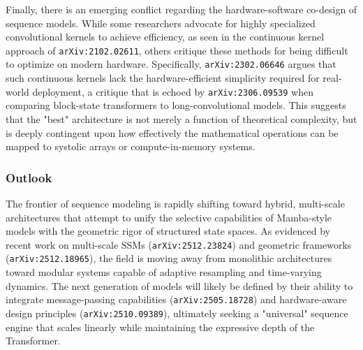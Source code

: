 \documentclass[11pt]{article}
\begin{document}
Finally, there is an emerging conflict regarding the hardware-software co-design of sequence models. While some researchers advocate for highly specialized convolutional kernels to achieve efficiency, as seen in the continuous kernel approach of \texttt{arXiv:2102.02611}, others critique these methods for being difficult to optimize on modern hardware. Specifically, \texttt{arXiv:2302.06646} argues that such continuous kernels lack the hardware-efficient simplicity required for real-world deployment, a critique that is echoed by \texttt{arXiv:2306.09539} when comparing block-state transformers to long-convolutional models. This suggests that the "best" architecture is not merely a function of theoretical complexity, but is deeply contingent upon how effectively the mathematical operations can be mapped to systolic arrays or compute-in-memory systems.

\subsubsection{Outlook}

The frontier of sequence modeling is rapidly shifting toward hybrid, multi-scale architectures that attempt to unify the selective capabilities of Mamba-style models with the geometric rigor of structured state spaces. As evidenced by recent work on multi-scale SSMs (\texttt{arXiv:2512.23824}) and geometric frameworks (\texttt{arXiv:2512.18965}), the field is moving away from monolithic architectures toward modular systems capable of adaptive resampling and time-varying dynamics. The next generation of models will likely be defined by their ability to integrate message-passing capabilities (\texttt{arXiv:2505.18728}) and hardware-aware design principles (\texttt{arXiv:2510.09389}), ultimately seeking a "universal" sequence engine that scales linearly while maintaining the expressive depth of the Transformer.
\end{document}
